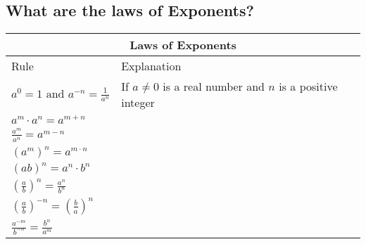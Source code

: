 \subsection{What are the laws of Exponents?}

\begin{small}
\begin{tabularx}{1\textwidth}{
    p{}
    p{}
}
\toprule
\multicolumn{2}{c}{\textbf{Laws of Exponents}} \\
\midrule

Rule & Explanation \\
\midrule

$ a^{0} = 1 \text{ and } a^{-n}  = \frac{1}{a^{n}} $
&
If $a \neq 0$ is a real number and $n$ is a positive integer
\\

\midrule

$ a^{m} \cdot a^{n} = a^{m + n} $ & \\
\midrule

$ \frac{a^{m}}{a^{n}} = a^{m-n} $ & \\
\midrule

$ \left( a^{m} \right)^{n} = a^{m \cdot n} $ & \\
\midrule

$ \left( ab \right)^{n} = a^{n} \cdot b^{n} $ & \\
\midrule

$ \left( \frac{a}{b} \right) ^{n} = \frac{a^{n}}{b^{n}} $ & \\
\midrule

$ \left( \frac{a}{b} \right)^{-n} = \left( \frac{b}{a} \right)^{n} $ & \\
\midrule

$ \frac{a^{-m}}{b^{-n}} = \frac{b^{n}}{a^{m}} $ & \\
\bottomrule

\end{tabularx}
\end{small}
